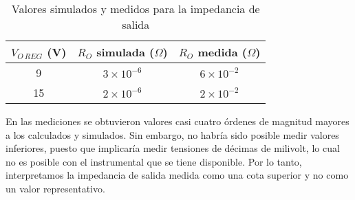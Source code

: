\documentclass[e2_tp1_main.tex]{subfiles}
\begin{document}
\begin{table}[!htb]
\centering
\begin{tabular}{|c|c|c|}
\hline
$V_{O\,REG}$ (V) & $R_O$ simulada ($\Omega$) & $R_O$ medida ($\Omega$) \\ \hline\hline
9                & $3 \times 10^{-6}$        & $6 \times 10^{-2}$      \\ \hline
15               & $2 \times 10^{-6}$        & $2 \times 10^{-2}$      \\ \hline
\end{tabular}
\caption{Valores simulados y medidos para la impedancia de salida}
\label{table:rout}
\end{table}

En las mediciones se obtuvieron valores casi cuatro \'ordenes de magnitud mayores a los calculados y simulados. Sin embargo, no habr\'ia sido posible medir valores inferiores, puesto que implicar\'ia medir tensiones de d\'ecimas de milivolt, lo cual no es posible con el instrumental que se tiene disponible. Por lo tanto, interpretamos la impedancia de salida medida como una cota superior y no como un valor representativo.
\end{document}
